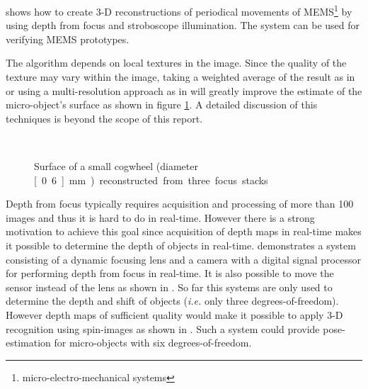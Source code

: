 \documentclass[a4paper,12pt]{book}
\begin{document}
\cite{RefWorks:57} shows how to create 3-D reconstructions of periodical
movements of MEMS\footnote{micro-electro-mechanical systems} by using
depth from focus and stroboscope illumination. The system can be used for
verifying MEMS prototypes.

The algorithm depends on local textures in the image. Since the quality of
the texture may vary within the image, taking a weighted average of
the result as in \cite{RefWorks:438} or using a multi-resolution approach
as in \cite{RefWorks:43} will greatly improve the estimate of the
micro-object's surface as shown in figure \ref{fig:smallwheel}.
A detailed discussion of this techniques is beyond the scope of this report.
\begin{figure}[htbp]
   \begin{center}
     \\
     \caption{Surface of a small cogwheel (diameter \unit[0.6]{mm})
       reconstructed from three focus
       stacks\cite{RefWorks:437}\label{fig:smallwheel}}
   \end{center}
\end{figure}

Depth from focus typically requires acquisition and processing of more than
100 images and thus it is hard to do in real-time. However there is a strong
motivation to achieve this goal since acquisition of depth maps in 
real-time makes it possible to determine the depth of objects in real-time.
\cite{RefWorks:121} demonstrates a system consisting of a dynamic
focusing lens and a camera with a digital signal processor for performing
depth from focus in real-time. It is also possible to move the sensor
instead of the lens as shown in \cite{RefWorks:439}. So far this systems
are only used to determine the depth and shift of objects (\emph{i.e.} only
three degrees-of-freedom). However depth maps of sufficient quality would make
it possible to apply 3-D recognition using spin-images as shown in
\cite{RefWorks:433}. Such a system could provide pose-estimation for
micro-objects with six degrees-of-freedom.
\end{document}
